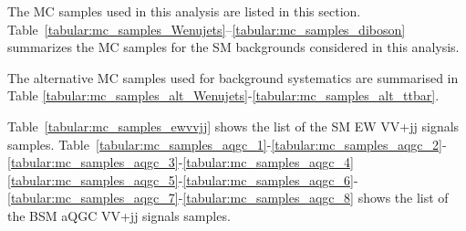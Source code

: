 
The MC samples used in this analysis are listed in this section.
Table~\ref{tabular:mc_samples_Wenujets}--\ref{tabular:mc_samples_diboson} summarizes the MC samples for the SM backgrounds considered in this analysis.

The alternative MC samples used for background systematics are summarised in Table 
\ref{tabular:mc_samples_alt_Wenujets}-\ref{tabular:mc_samples_alt_ttbar}.

Table~\ref{tabular:mc_samples_ewvvjj} shows the list of the SM EW VV+jj signals samples.
Table~\ref{tabular:mc_samples_aqgc_1}-\ref{tabular:mc_samples_aqgc_2}-\ref{tabular:mc_samples_aqgc_3}-\ref{tabular:mc_samples_aqgc_4}
\ref{tabular:mc_samples_aqgc_5}-\ref{tabular:mc_samples_aqgc_6}-\ref{tabular:mc_samples_aqgc_7}-\ref{tabular:mc_samples_aqgc_8}
shows the list of the BSM aQGC VV+jj signals samples.


